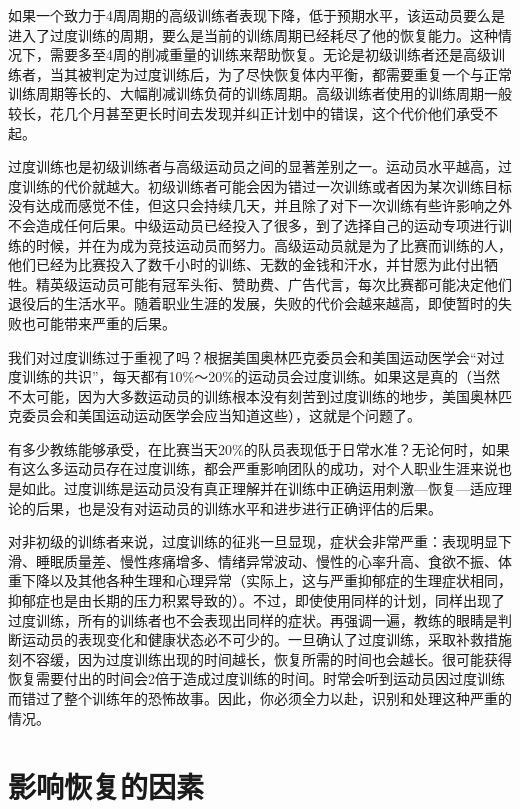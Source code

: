 如果一个致力于4周周期的高级训练者表现下降，低于预期水平，该运动员要么是进入了过度训练的周期，要么是当前的训练周期已经耗尽了他的恢复能力。这种情况下，需要多至4周的削减重量的训练来帮助恢复。无论是初级训练者还是高级训练者，当其被判定为过度训练后，为了尽快恢复体内平衡，都需要重复一个与正常训练周期等长的、大幅削减训练负荷的训练周期。高级训练者使用的训练周期一般较长，花几个月甚至更长时间去发现并纠正计划中的错误，这个代价他们承受不起。

过度训练也是初级训练者与高级运动员之间的显著差别之一。运动员水平越高，过度训练的代价就越大。初级训练者可能会因为错过一次训练或者因为某次训练目标没有达成而感觉不佳，但这只会持续几天，并且除了对下一次训练有些许影响之外不会造成任何后果。中级运动员已经投入了很多，到了选择自己的运动专项进行训练的时候，并在为成为竞技运动员而努力。高级运动员就是为了比赛而训练的人，他们已经为比赛投入了数千小时的训练、无数的金钱和汗水，并甘愿为此付出牺牲。精英级运动员可能有冠军头衔、赞助费、广告代言，每次比赛都可能决定他们退役后的生活水平。随着职业生涯的发展，失败的代价会越来越高，即使暂时的失败也可能带来严重的后果。

我们对过度训练过于重视了吗？根据美国奥林匹克委员会和美国运动医学会“对过度训练的共识”，每天都有10\%～20\%的运动员会过度训练。如果这是真的（当然不太可能，因为大多数运动员的训练根本没有刻苦到过度训练的地步，美国奥林匹克委员会和美国运动运动医学会应当知道这些），这就是个问题了。

有多少教练能够承受，在比赛当天20\%的队员表现低于日常水准？无论何时，如果有这么多运动员存在过度训练，都会严重影响团队的成功，对个人职业生涯来说也是如此。过度训练是运动员没有真正理解并在训练中正确运用刺激—恢复—适应理论的后果，也是没有对运动员的训练水平和进步进行正确评估的后果。

对非初级的训练者来说，过度训练的征兆一旦显现，症状会非常严重：表现明显下滑、睡眠质量差、慢性疼痛增多、情绪异常波动、慢性的心率升高、食欲不振、体重下降以及其他各种生理和心理异常（实际上，这与严重抑郁症的生理症状相同，抑郁症也是由长期的压力积累导致的）。不过，即使使用同样的计划，同样出现了过度训练，所有的训练者也不会表现出同样的症状。再强调一遍，教练的眼睛是判断运动员的表现变化和健康状态必不可少的。一旦确认了过度训练，采取补救措施刻不容缓，因为过度训练出现的时间越长，恢复所需的时间也会越长。很可能获得恢复需要付出的时间会2倍于造成过度训练的时间。时常会听到运动员因过度训练而错过了整个训练年的恐怖故事。因此，你必须全力以赴，识别和处理这种严重的情况。

\section{影响恢复的因素}


